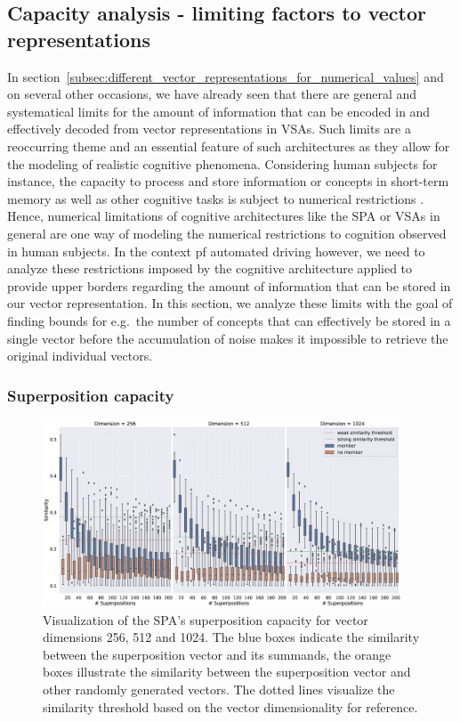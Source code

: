 \subsection{Capacity analysis - limiting factors to vector representations}%
\label{subsec:capacity_analysis_limitations_to_vector_representations}

In section~\ref{subsec:different_vector_representations_for_numerical_values} and on several other occasions, we have already seen that there are general and systematical limits for the amount of information that can be encoded in and effectively decoded from vector representations in \acp{VSA}.
Such limits are a reoccurring theme and an essential feature of such architectures as they allow for the modeling of realistic cognitive phenomena.
Considering human subjects for instance, the capacity to process and store information or concepts in short-term memory as well as other cognitive tasks is subject to numerical restrictions \cite{Miller1956}.
Hence, numerical limitations of cognitive architectures like the \ac{SPA} or \acp{VSA} in general are one way of modeling the numerical restrictions to cognition observed in human subjects.
In the context pf automated driving however, we need to analyze these restrictions imposed by the cognitive architecture applied to provide upper borders regarding the amount of information that can be stored in our vector representation.
In this section, we analyze these limits with the goal of finding bounds for e.g.\ the number of concepts that can effectively be stored in a single vector before the accumulation of noise makes it impossible to retrieve the original individual vectors.

\subsubsection{Superposition capacity}%
\label{ssubsec:superposition_capacity}

\begin{figure}[t]
	\centering
	\includegraphics[width=0.95\textwidth]{imgs/spa_superposition_capacity.eps}
	\caption{Visualization of the \ac{SPA}'s superposition capacity for vector dimensions \num{256}, \num{512} and \num{1024}.
    The blue boxes indicate the similarity between the superposition vector and its summands, the orange boxes illustrate the similarity between the superposition vector and other randomly generated vectors.
    The dotted lines visualize the similarity threshold based on the vector dimensionality for reference.}
	\label{fig:spa_superposition_capacity}
\end{figure}

